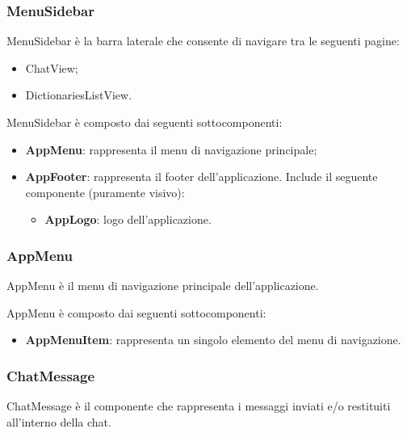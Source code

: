 \subsubsection{MenuSidebar}

\par MenuSidebar è la barra laterale che consente di navigare tra le seguenti pagine:
\begin{itemize}
  \item ChatView;
  \item DictionariesListView.
\end{itemize}

\par MenuSidebar è composto dai seguenti sottocomponenti:
\begin{itemize}
  \item \textbf{AppMenu}: rappresenta il menu di navigazione principale;
  \item \textbf{AppFooter}: rappresenta il footer dell'applicazione. Include il seguente componente (puramente visivo):
  \begin{itemize}
    \item \textbf{AppLogo}: logo dell'applicazione.
  \end{itemize}
\end{itemize}

\subsubsection{AppMenu}

\par AppMenu è il menu di navigazione principale dell'applicazione.

\par AppMenu è composto dai seguenti sottocomponenti:
\begin{itemize}
  \item \textbf{AppMenuItem}: rappresenta un singolo elemento del menu di navigazione.
\end{itemize}

\subsubsection{ChatMessage}

\par ChatMessage è il componente che rappresenta i messaggi inviati e/o restituiti all'interno della chat.

